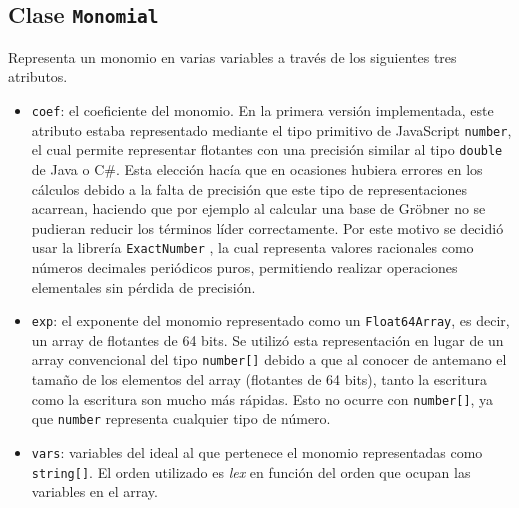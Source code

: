 \subsection{Clase \texttt{Monomial}}
Representa un monomio en varias variables a través de los siguientes tres atributos.
\begin{itemize}
    \item \texttt{coef}: el coeficiente del monomio. En la primera versión implementada, este atributo estaba representado mediante el tipo primitivo de JavaScript \texttt{number}, el cual permite representar flotantes con una precisión similar al tipo \texttt{double} de Java o C\#. Esta elección hacía que en ocasiones hubiera errores en los cálculos debido a la falta de precisión que este tipo de representaciones acarrean, haciendo que por ejemplo al calcular una base de Gröbner no se pudieran reducir los términos líder correctamente. Por este motivo se decidió usar la librería \texttt{ExactNumber} \cite{ExactNumber}, la cual representa valores racionales como números decimales periódicos puros, permitiendo realizar operaciones elementales sin pérdida de precisión.
    \item \texttt{exp}: el exponente del monomio representado como un \texttt{Float64Array}, es decir, un array de flotantes de 64 bits. Se utilizó esta representación en lugar de un array convencional del tipo \texttt{number[]} debido a que al conocer de antemano el tamaño de los elementos del array (flotantes de 64 bits), tanto la escritura como la escritura son mucho más rápidas. Esto no ocurre con \texttt{number[]}, ya que \texttt{number} representa cualquier tipo de número.
    \item \texttt{vars}: variables del ideal al que pertenece el monomio representadas como \texttt{string[]}. El orden utilizado es \textit{lex} en función del orden que  ocupan las variables en el array.
\end{itemize}

